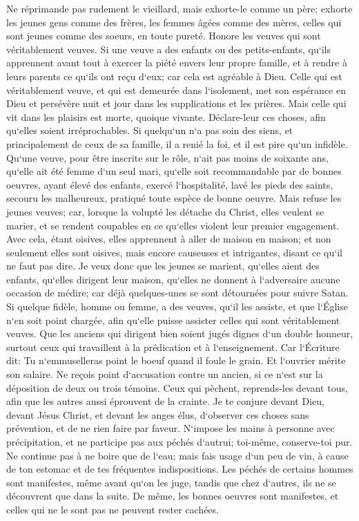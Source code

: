 \verse Ne réprimande pas rudement le vieillard, mais exhorte-le comme un père; exhorte les jeunes gens comme des frères, 
\verse les femmes âgées comme des mères, celles qui sont jeunes comme des soeurs, en toute pureté. 
\verse Honore les veuves qui sont véritablement veuves. 
\verse Si une veuve a des enfants ou des petits-enfants, qu`ils apprennent avant tout à exercer la piété envers leur propre famille, et à rendre à leurs parents ce qu`ils ont reçu d`eux; car cela est agréable à Dieu. 
\verse Celle qui est véritablement veuve, et qui est demeurée dans l`isolement, met son espérance en Dieu et persévère nuit et jour dans les supplications et les prières. 
\verse Mais celle qui vit dans les plaisirs est morte, quoique vivante. 
\verse Déclare-leur ces choses, afin qu`elles soient irréprochables. 
\verse Si quelqu`un n`a pas soin des siens, et principalement de ceux de sa famille, il a renié la foi, et il est pire qu`un infidèle. 
\verse Qu`une veuve, pour être inscrite sur le rôle, n`ait pas moins de soixante ans, qu`elle ait été femme d`un seul mari, 
\verse qu`elle soit recommandable par de bonnes oeuvres, ayant élevé des enfants, exercé l`hospitalité, lavé les pieds des saints, secouru les malheureux, pratiqué toute espèce de bonne oeuvre. 
\verse Mais refuse les jeunes veuves; car, lorsque la volupté les détache du Christ, elles veulent se marier, 
\verse et se rendent coupables en ce qu`elles violent leur premier engagement. 
\verse Avec cela, étant oisives, elles apprennent à aller de maison en maison; et non seulement elles sont oisives, mais encore causeuses et intrigantes, disant ce qu`il ne faut pas dire. 
\verse Je veux donc que les jeunes se marient, qu`elles aient des enfants, qu`elles dirigent leur maison, qu`elles ne donnent à l`adversaire aucune occasion de médire; 
\verse car déjà quelques-unes se sont détournées pour suivre Satan. 
\verse Si quelque fidèle, homme ou femme, a des veuves, qu`il les assiste, et que l`Église n`en soit point chargée, afin qu`elle puisse assister celles qui sont véritablement veuves. 
\verse Que les anciens qui dirigent bien soient jugés dignes d`un double honneur, surtout ceux qui travaillent à la prédication et à l`enseignement. 
\verse Car l`Écriture dit: Tu n`emmuselleras point le boeuf quand il foule le grain. Et l`ouvrier mérite son salaire. 
\verse Ne reçois point d`accusation contre un ancien, si ce n`est sur la déposition de deux ou trois témoins. 
\verse Ceux qui pèchent, reprends-les devant tous, afin que les autres aussi éprouvent de la crainte. 
\verse Je te conjure devant Dieu, devant Jésus Christ, et devant les anges élus, d`observer ces choses sans prévention, et de ne rien faire par faveur. 
\verse N`impose les mains à personne avec précipitation, et ne participe pas aux péchés d`autrui; toi-même, conserve-toi pur. 
\verse Ne continue pas à ne boire que de l`eau; mais fais usage d`un peu de vin, à cause de ton estomac et de tes fréquentes indispositions. 
\verse Les péchés de certains hommes sont manifestes, même avant qu`on les juge, tandis que chez d`autres, ils ne se découvrent que dans la suite. 
\verse De même, les bonnes oeuvres sont manifestes, et celles qui ne le sont pas ne peuvent rester cachées. 

